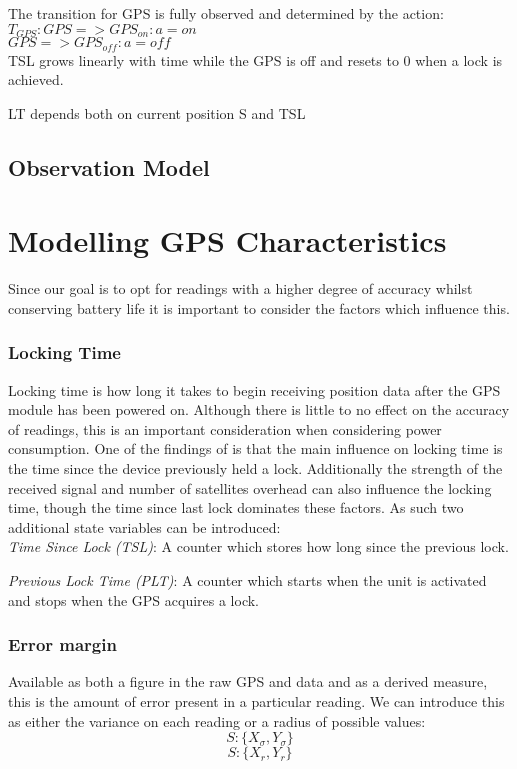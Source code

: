 \documentclass[12pt,openany,a4paper]{book}
\begin{document}
The transition for GPS is fully observed and  determined by the action:\\
\ensuremath{T_{GPS} : GPS => GPS_{on} : a = on } \\
\indent \ensuremath{GPS => GPS_{off} : a = off} \\

TSL grows linearly with time while the GPS is off and resets to 0 when a lock is achieved.

LT depends both on current position S and TSL

\subsection*{Observation Model}


\newpage
\section{Modelling GPS Characteristics}
Since our goal is to opt for readings with a higher degree of accuracy whilst conserving battery life it is important to consider the factors which influence this.

\subsubsection*{Locking Time}
Locking time is how long it takes to begin receiving position data after the GPS module has been powered on. Although there is little to no effect on the accuracy of readings, this is an important consideration when considering power consumption. One of the findings of \cite{jurdak} is that the main influence on locking time is the time since the device previously held a lock. Additionally the strength of the received signal and number of satellites overhead can also influence the locking time, though the time since last lock dominates these factors.
As such two additional state variables can be introduced:\\

\noindent\emph{Time Since Lock (TSL)}: A counter which stores how long since the previous lock.

\noindent\emph{Previous Lock Time (PLT)}: A counter which starts when the unit is activated and stops when the GPS acquires a lock.

\subsubsection*{Error margin}
Available as both a figure in the raw GPS and data and as a derived measure, this is the amount of error present in a particular reading.
We can introduce this as either the variance on each reading or a radius of possible values:
\[ S : \{X_{\sigma}, Y_{\sigma}\}\]
\[ S : \{X_{r} , Y_{r}\} \]
\end{document}
